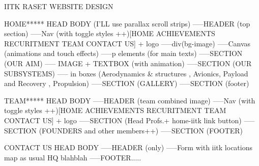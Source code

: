 IITK RASET WEBSITE DESIGN

HOME*****
HEAD
BODY (I'LL use parallax scroll strips)
 -----HEADER (top section)
        -----Nav (with toggle styles ++)[HOME  ACHIEVEMENTS  RECURITMENT TEAM CONTACT US] + logo
        -----div(bg-image)
        -----Canvas (animations and touch effects)
        -----p elements (for main texts)
 -----SECTION (OUR AIM)
        ----- IMAGE + TEXTBOX (with animation)
 -----SECTION (OUR SUBSYSTEMS)
        ----- in boxes (Aerodynamics & structures , Avionics, Payload and Recovery , Propulsion)
 -----SECTION (GALLERY)
 -----SECTION (footer)

TEAM*****
HEAD
BODY
 -----HEADER (team combined image)
        -----Nav (with toggle styles ++)[HOME  ACHIEVEMENTS  RECURITMENT TEAM CONTACT US] + logo
 -----SECTION (Head Profs.+ home-iitk link button)
 -----SECTION (FOUNDERS and other members++)
 -----SECTION (FOOTER)

CONTACT US
HEAD
BODY
 -----HEADER (only)
        -----Form with iitk locations map as usual HQ blahblah
 -----FOOTER.....
